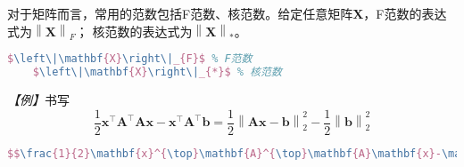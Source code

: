 对于矩阵而言，常用的范数包括F范数、核范数。给定任意矩阵$\mathbf{X}$，F范数的表达式为$\left\|\mathbf{X}\right\|_{F}$；
核范数的表达式为$\left\|\mathbf{X}\right\|_{*}$。
\begin{lstlisting}[language=TeX]
    $\left\|\mathbf{X}\right\|_{F}$ % F范数
    $\left\|\mathbf{X}\right\|_{*}$ % 核范数
\end{lstlisting}

\emph{【例】}书写
$$\frac{1}{2}\mathbf{x}^{\top}\mathbf{A}^{\top}\mathbf{A}\mathbf{x}-\mathbf{x}^{\top}\mathbf{A}^{\top}\mathbf{b}=\frac{1}{2}\left\|\mathbf{A}\mathbf{x}-\mathbf{b}\right\|_{2}^{2}-\frac{1}{2}\left\|\mathbf{b}\right\|_{2}^{2}$$
\begin{lstlisting}[language=TeX]
    $$\frac{1}{2}\mathbf{x}^{\top}\mathbf{A}^{\top}\mathbf{A}\mathbf{x}-\mathbf{x}^{\top}\mathbf{A}^{\top}\mathbf{b}=\frac{1}{2}\left\|\mathbf{A}\mathbf{x}-\mathbf{b}\right\|_{2}^{2}-\frac{1}{2}\left\|\mathbf{b}\right\|_{2}^{2}$$
\end{lstlisting}

